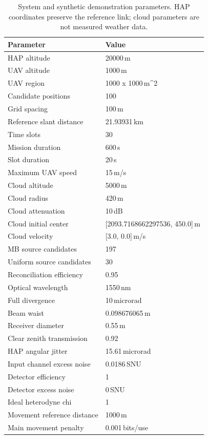 \begin{table}[t]
\caption{System and synthetic demonstration parameters. HAP coordinates preserve the reference link; cloud parameters are not measured weather data.}
\label{tab:mobility_system}
\centering\scriptsize
\begin{tabular}{ll}\hline
Parameter & Value \\ \hline
HAP altitude & 20000\,m \\
UAV altitude & 1000\,m \\
UAV region & 1000 x 1000\,m\textasciicircum{}2 \\
Candidate positions & 100 \\
Grid spacing & 100\,m \\
Reference slant distance & 21.93931\,km \\
Time slots & 30 \\
Mission duration & 600\,s \\
Slot duration & 20\,s \\
Maximum UAV speed & 15\,m/s \\
Cloud altitude & 5000\,m \\
Cloud radius & 420\,m \\
Cloud attenuation & 10\,dB \\
Cloud initial center & [2093.7168662297536, 450.0]\,m \\
Cloud velocity & [3.0, 0.0]\,m/s \\
MB source candidates & 197 \\
Uniform source candidates & 30 \\
Reconciliation efficiency & 0.95 \\
Optical wavelength & 1550\,nm \\
Full divergence & 10\,microrad \\
Beam waist & 0.098676065\,m \\
Receiver diameter & 0.55\,m \\
Clear zenith transmission & 0.92 \\
HAP angular jitter & 15.61\,microrad \\
Input channel excess noise & 0.0186\,SNU \\
Detector efficiency & 1 \\
Detector excess noise & 0\,SNU \\
Ideal heterodyne chi & 1 \\
Movement reference distance & 1000\,m \\
Main movement penalty & 0.001\,bits/use \\
\hline\end{tabular}
\end{table}

